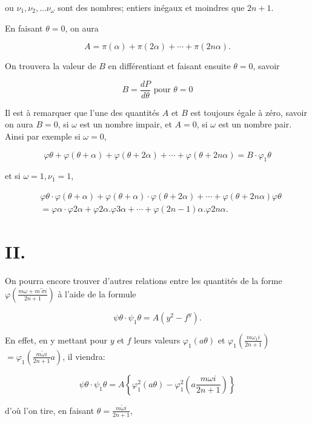 \documentclass{article}
\begin{document}
ou \(\nu_{1}, \nu_{2}, \ldots \nu_{\omega}\) sont des nombres; entiers inégaux et moindres que \(2 n+1\).

En faisant \(\theta=0\), on aura

\[
A=\pi(\alpha)+\pi(2 \alpha)+\cdots+\pi(2 n \alpha) .
\]

On trouvera la valeur de \(B\) en différentiant et faisant ensuite \(\theta=0\), savoir

\[
B=\frac{d P}{d \theta} \text { pour } \theta=0
\]

Il est à remarquer que l'une des quantités \(A\) et \(B\) est toujours égale à zéro, savoir on aura \(B=0\), si \(\omega\) est un nombre impair, et \(A=0\), si \(\omega\) est un nombre pair. Ainsi par exemple si \(\omega=0\),

\[
\varphi \theta+\varphi(\theta+\alpha)+\varphi(\theta+2 \alpha)+\cdots+\varphi(\theta+2 n \alpha)=B \cdot \varphi_{1} \theta
\]

et si \(\omega=1, \nu_{1}=1\),

\[
\begin{aligned}
& \varphi \theta \cdot \varphi(\theta+\alpha)+\varphi(\theta+\alpha) \cdot \varphi(\theta+2 \alpha)+\cdots+\varphi(\theta+2 n \alpha) \varphi \theta \\
& =\varphi \alpha \cdot \varphi 2 \alpha+\varphi 2 \alpha . \varphi 3 \alpha+\cdots+\varphi(2 n-1) \alpha . \varphi 2 n \alpha .
\end{aligned}
\]

\section*{II.}

On pourra encore trouver d'autres relations entre les quantités de la forme \(\varphi\left(\frac{m \omega+m^{\prime} \tilde{\sigma} i}{2 n+1}\right)\) à l'aide de la formule

\[
\psi \theta \cdot \psi_{1} \theta=A\left(y^{2}-f^{y}\right) .
\]

En effet, en y mettant pour \(y\) et \(f\) leurs valeurs \(\varphi_{1}(a \theta)\) et \(\varphi_{1}\left(\frac{m \omega_{1} i}{2 n+1}\right)\) \(=\varphi_{1}\left(\frac{m \tilde{\omega} i}{2 n+1} a\right)\), il viendra:

\[
\psi \theta \cdot \psi_{1} \theta=A\left\{\varphi_{1}^{2}(a \theta)-\varphi_{1}^{2}\left(a \frac{m \omega i}{2 n+1}\right)\right\}
\]

d'où l'on tire, en faisant \(\theta=\frac{m \tilde{\omega} i}{2 n+1}\),
\end{document}
